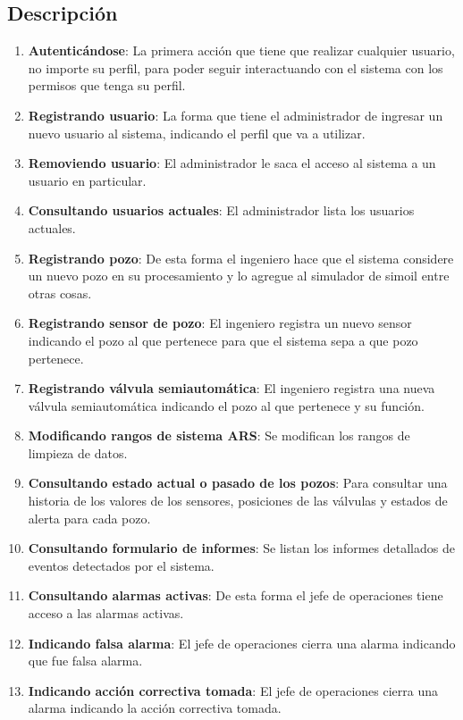\documentclass{article}
\theoremstyle{definition}
\theoremstyle{remark}
\begin{document}
\subsection{Descripción}

\begin{enumerate}
    \item \textbf{Autenticándose}: La primera acción que tiene que realizar cualquier usuario, no importe su perfil, para poder seguir interactuando con el sistema con los permisos que tenga su perfil.
    \item \textbf{Registrando usuario}: La forma que tiene el administrador de ingresar un nuevo usuario al sistema, indicando el perfil que va a utilizar.
    \item \textbf{Removiendo usuario}: El administrador le saca el acceso al sistema a un usuario en particular.
    \item \textbf{Consultando usuarios actuales}: El administrador lista los usuarios actuales.
    \item \textbf{Registrando pozo}: De esta forma el ingeniero hace que el sistema considere un nuevo pozo en su procesamiento y lo agregue al simulador de simoil entre otras cosas.
    \item \textbf{Registrando sensor de pozo}: El ingeniero registra un nuevo sensor indicando el pozo al que pertenece para que el sistema sepa a que pozo pertenece.
    \item \textbf{Registrando válvula semiautomática}: El ingeniero registra una nueva válvula semiautomática indicando el pozo al que pertenece y su función.
    \item \textbf{Modificando rangos de sistema ARS}: Se modifican los rangos de limpieza de datos.
    \item \textbf{Consultando estado actual o pasado de los pozos}: Para consultar una historia de los valores de los sensores, posiciones de las válvulas y estados de alerta para cada pozo.
    \item \textbf{Consultando formulario de informes}: Se listan los informes detallados de eventos detectados por el sistema.
    \item \textbf{Consultando alarmas activas}: De esta forma el jefe de operaciones tiene acceso a las alarmas activas.
    \item \textbf{Indicando falsa alarma}: El jefe de operaciones cierra una alarma indicando que fue falsa alarma.
    \item \textbf{Indicando acción correctiva tomada}: El jefe de operaciones cierra una alarma indicando la acción correctiva tomada.
\end{enumerate}
\end{document}
